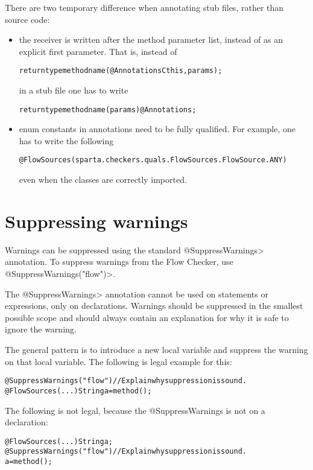 There are two temporary difference when annotating stub files, rather
than source code:
\begin{itemize}
\item the receiver is written after the method parameter list, instead of
as an explicit first parameter.
That is, instead of

\begin{alltt}
     returntype methodname(@Annotations C this, params);
\end{alltt}

in a stub file one has to write

\begin{alltt}
     returntype methodname(params) @Annotations;
\end{alltt}

\item enum constants in annotations need to be fully qualified.
For example, one has to write the following

\begin{alltt}
@FlowSources(sparta.checkers.quals.FlowSources.FlowSource.ANY)
\end{alltt}

even when the classes are correctly imported.

\end{itemize}




\section{Suppressing warnings}

Warnings can be suppressed using the standard \<@SuppressWarnings>
annotation.
To suppress warnings from the Flow Checker, use
\<@SuppressWarnings("flow")>.

The \<@SuppressWarnings> annotation cannot be used on statements or
expressions, only on declarations.
Warnings should be suppressed in the smallest possible scope and
should always contain an explanation for why it is safe to ignore the
warning.

The general pattern is to introduce a new local variable and suppress
the warning on that local variable.
The following is legal example for this:

\begin{alltt}
	@SuppressWarnings("flow") // Explain why suppression is sound.
	@FlowSources(...) String a = method();
\end{alltt}

The following is not legal, because the @SuppressWarnings is not on a
declaration:

\begin{alltt}
	@FlowSources(...) String a; 
	@SuppressWarnings("flow") // Explain why suppression is sound.
	a = method();
\end{alltt}


